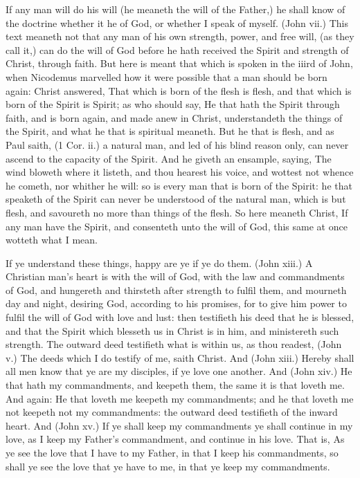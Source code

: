 If any man will do his will (he meaneth the will of the 
Father,) he shall know of the doctrine whether it he of 
God, or whether I speak of myself. (John vii.) This 
text meaneth not that any man of his own strength, power, 
and free will, (as they call it,) can do the will of God 
before he hath received the Spirit and strength of 
Christ, through faith. But here is meant that which is 
spoken in the iiird of John, when Nicodemus marvelled 
how it were possible that a man should be born again: 
Christ answered, That which is born of the flesh is flesh, 
and that which is born of the Spirit is Spirit; as who 
should say, He that hath the Spirit through faith, and is 
born again, and made anew in Christ, understandeth the 
things of the Spirit, and what he that is spiritual meaneth. 
But he that is flesh, and as Paul saith, (1 Cor. ii.) a natural
man, and led of his blind reason only, can never 
ascend to the capacity of the Spirit. And he giveth an 
ensample, saying, The wind bloweth where it listeth, and 
thou hearest his voice, and wottest not whence he cometh, 
nor whither he will: so is every man that is born of the 
Spirit: he that speaketh of the Spirit can never be understood
of the natural man, which is but flesh, and 
savoureth no more than things of the flesh. So here 
meaneth Christ, If any man have the Spirit, and consenteth
unto the will of God, this same at once wotteth 
what I mean. 


If ye understand these things, happy are ye if ye do 
them. (John xiii.) A Christian man's heart is with the
will of God, with the law and commandments of God, 
and hungereth and thirsteth after strength to fulfil them, 
and mourneth day and night, desiring God, according to 
his promises, for to give him power to fulfil the will of 
God with love and lust: then testifieth his deed that he is 
blessed, and that the Spirit which blesseth us in Christ is 
in him, and ministereth such strength. The outward deed 
testifieth what is within us, as thou readest, (John v.) The
deeds which I do testify of me, saith Christ. And 
(John xiii.) Hereby shall all men know that ye are my 
disciples, if ye love one another. And (John xiv.) He that 
hath my commandments, and keepeth them, the same it 
is that loveth me. And again: He that loveth me keepeth 
my commandments; and he that loveth me not keepeth 
not my commandments: the outward deed testifieth of 
the inward heart. And (John xv.) If ye shall keep my 
commandments ye shall continue in my love, as I keep 
my Father's commandment, and continue in his love. 
That is, As ye see the love that I have to my Father, in 
that I keep his commandments, so shall ye see the love 
that ye have to me, in that ye keep my commandments. 

